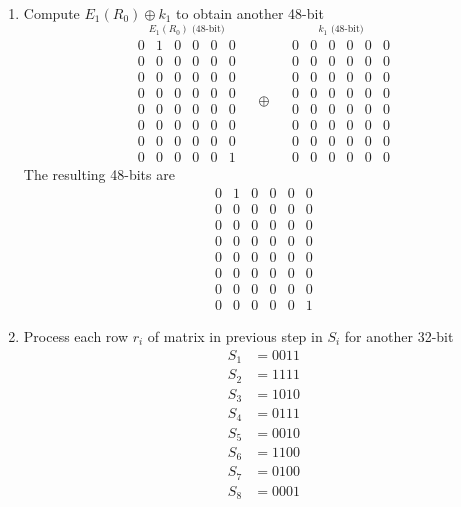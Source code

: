 \documentclass[12pt]{article}
\begin{document}
\begin{enumerate}
\begin{enumerate}
\begin{enumerate}
\begin{enumerate}
				\item
					Compute $E_1(R_0) \oplus k_1$ to obtain another 48-bit
					\[
					\stackrel{\mbox{$E_1(R_0)$ (48-bit)}}{
					\begin{matrix}
						0&1&0&0&0&0\\ 
						0&0&0&0&0&0\\
						0&0&0&0&0&0\\
						0&0&0&0&0&0\\
						0&0&0&0&0&0\\
						0&0&0&0&0&0\\
						0&0&0&0&0&0\\
						0&0&0&0&0&1
					\end{matrix}}
					\quad\oplus\quad
					\stackrel{\mbox{$k_1$ (48-bit)}}{
					\begin{matrix}
						0&0&0&0&0&0\\ 
						0&0&0&0&0&0\\
						0&0&0&0&0&0\\
						0&0&0&0&0&0\\
						0&0&0&0&0&0\\
						0&0&0&0&0&0\\
						0&0&0&0&0&0\\
						0&0&0&0&0&0
					\end{matrix}}
					\]
					The resulting 48-bits are
					\[
					\begin{matrix}
						0&1&0&0&0&0\\ 
						0&0&0&0&0&0\\
						0&0&0&0&0&0\\
						0&0&0&0&0&0\\
						0&0&0&0&0&0\\
						0&0&0&0&0&0\\
						0&0&0&0&0&0\\
						0&0&0&0&0&1
					\end{matrix}
					\]
				
				\newpage\item
					Process each row $r_i$ of matrix in previous step in $S_i$ for another 32-bit
					\begin{align*}
					S_1 &= 0011\\
					S_2 &= 1111\\
					S_3 &= 1010\\
					S_4 &= 0111\\
					S_5 &= 0010\\
					S_6 &= 1100\\
					S_7 &= 0100\\
					S_8 &= 0001
					\end{align*}
					

\end{enumerate}
\end{enumerate}
\end{enumerate}
\end{enumerate}
\end{document}
